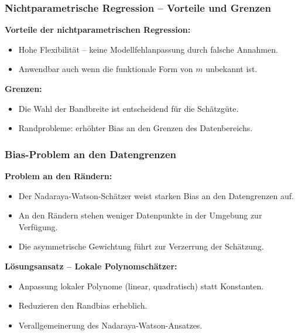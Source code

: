 \documentclass{beamer}
\newif\ifpauseswitch
\begin{document}
	
	\begin{frame}
		\frametitle{Nichtparametrische Regression – Vorteile und Grenzen}
		
		\textbf{Vorteile der nichtparametrischen Regression:}
		\begin{itemize}
			\itemsep8pt
			\item Hohe Flexibilität – keine Modellfehlanpassung durch falsche Annahmen.
			\item Anwendbar auch wenn die funktionale Form von $m$ unbekannt ist.
		\end{itemize}
		
		\vspace{0.5em}
		
		\ifpauseswitch
		\pause
		\fi
		
		\textbf{Grenzen:}
		\begin{itemize}
			\itemsep8pt
			\item Die Wahl der Bandbreite ist entscheidend für die Schätzgüte.
			\item Randprobleme: erhöhter Bias an den Grenzen des Datenbereichs.
		\end{itemize}
	\end{frame}
	
	
	\begin{frame}
		\frametitle{Bias-Problem an den Datengrenzen}
		
		\textbf{Problem an den Rändern:}
		\begin{itemize}
			\itemsep8pt
			\item Der Nadaraya-Watson-Schätzer weist starken Bias an den Datengrenzen auf.
			\item An den Rändern stehen weniger Datenpunkte in der Umgebung zur Verfügung.
			\item Die asymmetrische Gewichtung führt zur Verzerrung der Schätzung.
		\end{itemize}
		
		\vspace{0.5em}
		
		\ifpauseswitch
		\pause
		\fi
		
		\textbf{Lösungsansatz – Lokale Polynomschätzer:}
		\begin{itemize}
			\itemsep8pt
			\item Anpassung lokaler Polynome (linear, quadratisch) statt Konstanten.
			\item Reduzieren den Randbias erheblich.
			\item Verallgemeinerung des Nadaraya-Watson-Ansatzes.
		\end{itemize}
	\end{frame}
	
\end{document}
